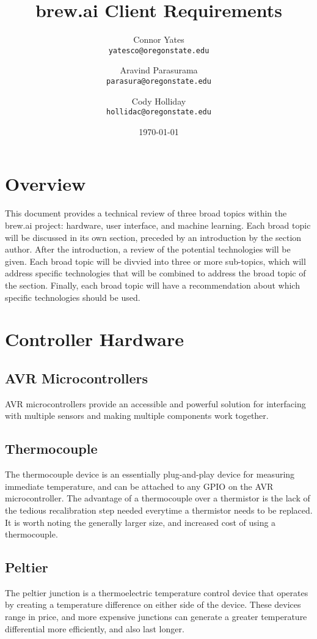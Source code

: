 \documentclass[draftclsnofoot,onecolumn,letterpaper,10pt]{IEEEtran}
\author{Connor Yates\\
\texttt{yatesco@oregonstate.edu\\}
\and
Aravind Parasurama\\
\texttt{parasura@oregonstate.edu\\}
\and
Cody Holliday\\
\texttt{hollidac@oregonstate.edu\\}}
\date{\today}
\title{brew.ai Client Requirements}
\begin{document}
\maketitle

\newpage
\tableofcontents
\newpage
\section{Overview}
This document provides a technical review of three broad topics within the brew.ai project: hardware, user interface, and machine learning.
Each broad topic will be discussed in its own section, preceded by an introduction by the section author.
After the introduction, a review of the potential technologies will be given.
Each broad topic will be divvied into three or more sub-topics, which will address specific technologies that will be combined to address the broad topic of the section.
Finally, each broad topic will have a recommendation about which specific technologies should be used.

\section{Controller Hardware}
\subsection{AVR Microcontrollers}
AVR microcontrollers provide an accessible and powerful solution for interfacing with multiple sensors and making multiple 
components work together.


\subsection{Thermocouple}
The thermocouple device is an essentially plug-and-play device for measuring immediate temperature, and can be attached to 
any GPIO on the AVR microcontroller. 
The advantage of a thermocouple over a thermistor is the lack of the tedious recalibration step needed everytime a thermistor 
needs to be replaced. 
It is worth noting the generally larger size, and increased cost of using a thermocouple.

\subsection{Peltier}
The peltier junction is a thermoelectric temperature control device that operates by creating a temperature difference on
either side of the device.
These devices range in price, and more expensive junctions can generate a greater temperature differential more efficiently, 
and also last longer.
\end{document}
